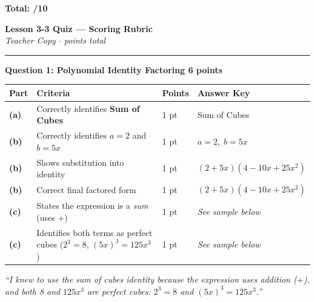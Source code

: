 \documentclass[11pt]{article}
\begin{document}
\vspace{6pt}
\hfill \textbf{Total: \qquad /10}

\newpage


\begin{center}
{\LARGE\bfseries Lesson 3-3 Quiz --- Scoring Rubric}\\[4pt]
{\small\itshape Teacher Copy \quad$\cdot$ points total}
\end{center}

\vspace{4pt}
\noindent\rule{\linewidth}{1.5pt}
\vspace{8pt}

{\large\bfseries Question 1: Polynomial Identity Factoring \hfill 6 points}

\vspace{6pt}

\renewcommand{\arraystretch}{1.4}
\noindent
\begin{tabular}{>{\bfseries}p{1.2cm} p{5.5cm} p{3cm} p{4.5cm}}
\toprule
\rowcolor{rubrichead}\color{white}Part & \color{white}Criteria & \color{white}Points & \color{white}Answer Key \\
\midrule
\rowcolor{rubriclight}
(a) & Correctly identifies \textbf{Sum of Cubes} & 1 pt & Sum of Cubes \\
\rowcolor{white}
(b) & Correctly identifies $a = 2$ and $b = 5x$ & 1 pt & $a=2,\; b=5x$ \\
\rowcolor{rubriclight}
(b) & Shows substitution into identity & 1 pt & $(2+5x)(4-10x+25x^2)$ \\
\rowcolor{white}
(b) & Correct final factored form & 1 pt & $(2+5x)(4-10x+25x^2)$ \\
\rowcolor{rubriclight}
(c) & States the expression is a \textit{sum} (uses $+$) & 1 pt & \textit{See sample below} \\
\rowcolor{white}
(c) & Identifies both terms as perfect cubes ($2^3=8$, $(5x)^3=125x^3$) & 1 pt & \textit{See sample below} \\
\bottomrule
\end{tabular}

\vspace{8pt}
\begin{tcolorbox}[colback=white, colframe=rubrichead, title={\color{white}Sample response for (c)}, fonttitle=\bfseries\small, coltitle=white]
\textit{``I knew to use the sum of cubes identity because the expression uses addition ($+$), and both 8 and $125x^3$ are perfect cubes: $2^3 = 8$ and $(5x)^3 = 125x^3$.''}
\end{tcolorbox}
\end{document}
